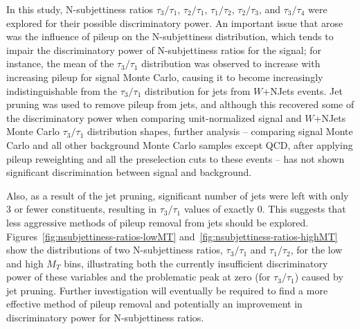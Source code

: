 In this study, N-subjettiness ratios $\tau_{3}/\tau_{1}$, $\tau_{2}/\tau_{1}$, $\tau_{1}/\tau_{2}$, $\tau_{2}/\tau_{3}$, and $\tau_{3}/\tau_{4}$  were explored for their possible discriminatory power. An important issue that arose was the influence of pileup on the N-subjettiness distribution, which tends to impair the discriminatory power of N-subjettiness ratios for the signal; for instance, the mean of the $\tau_{3}/\tau_{1}$ distribution was observed to increase with increasing pileup for signal Monte Carlo, causing it to become increasingly indistinguishable from the $\tau_{3}/\tau_{1}$ distribution for jets from $W$+NJets events. Jet pruning was used to remove pileup from jets, and although this recovered some of the discriminatory power when comparing unit-normalized signal and $W$+NJets Monte Carlo $\tau_{3}/\tau_{1}$ distribution shapes, further analysis -- comparing signal Monte Carlo and all other background Monte Carlo samples except QCD, after applying pileup reweighting and all the preselection cuts to these events -- has not shown significant discrimination between signal and background.

Also, as a result of the jet pruning, significant number of jets were left with only 3 or fewer constituents, resulting in $\tau_{3}/\tau_{1}$ values of exactly 0. This suggests that less aggressive methods of pileup removal from jets should be explored. Figures~\ref{fig:nsubjettiness-ratios-lowMT} and~\ref{fig:nsubjettiness-ratios-highMT} show the distributions of two N-subjettiness ratios, $\tau_{3}/\tau_{1}$ and $\tau_{1}/\tau_{2}$, for the low and high $M_{T}$ bins, illustrating both the currently insufficient discriminatory power of these variables and the problematic peak at zero (for $\tau_{3}/\tau_{1}$) caused by jet pruning. Further investigation will eventually be required to find a more effective method of pileup removal and potentially an improvement in discriminatory power for N-subjettiness ratios.

